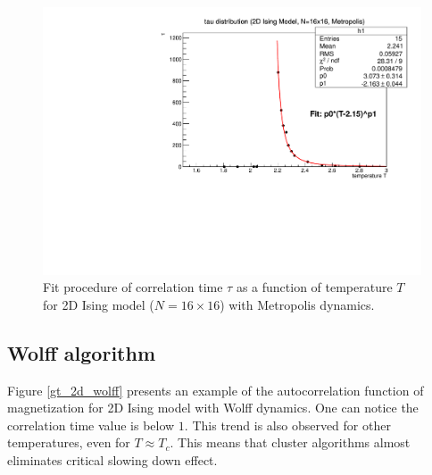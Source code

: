 \documentclass[11pt,a4paper]{article}%
\begin{document}
\begin{figure}[!ht]
\centering
  \includegraphics[scale=0.6]{IsingTestTCorr_T_vs_tau_fit_2D.pdf}
  \vspace{-0.05in}
   \caption[]{Fit procedure of correlation time $\tau$ as a function of temperature $T$ for 2D Ising model ($N=16\times16$) with Metropolis dynamics.  }   
  \label{tau_vs_xi_2d}
\end{figure}

\subsection{Wolff algorithm}
Figure \ref{gt_2d_wolff} presents an example of the autocorrelation function of magnetization for 2D Ising model with Wolff dynamics.
One can notice the correlation time value is below $1$. This trend is also observed for other temperatures, even for $T\approx T_c$.
This means that cluster algorithms almost eliminates critical slowing down effect.
\end{document}
